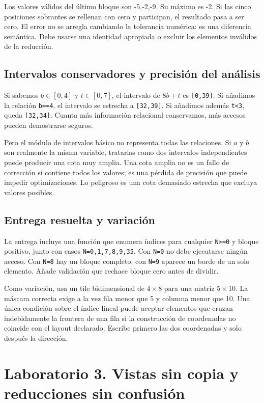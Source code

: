 \documentclass[12pt,a4paper,oneside]{report}
\begin{document}
\begin{ejemplo}
Los valores válidos del último bloque son -5,-2,-9. Su máximo es -2. Si las cinco posiciones sobrantes se rellenan con cero y participan, el resultado pasa a ser cero. El error no se arregla cambiando la tolerancia numérica: es una diferencia semántica. Debe usarse una identidad apropiada o excluir los elementos inválidos de la reducción.

\end{ejemplo}
\section{Intervalos conservadores y precisión del análisis}
Si sabemos $b\in[0,4]$ y $t\in[0,7]$, el intervalo de $8b+t$ es \texttt{[0,39]}. Si añadimos la relación \texttt{b==4}, el intervalo se estrecha a \texttt{[32,39]}. Si añadimos además \texttt{t<3}, queda \texttt{[32,34]}. Cuanta más información relacional conservamos, más accesos pueden demostrarse seguros.

Pero el módulo de intervalos básico no representa todas las relaciones. Si $a$ y $b$ son realmente la misma variable, tratarlas como dos intervalos independientes puede producir una cota muy amplia. Una cota amplia no es un fallo de corrección si contiene todos los valores; es una pérdida de precisión que puede impedir optimizaciones. Lo peligroso es una cota demasiado estrecha que excluya valores posibles.

\section{Entrega resuelta y variación}
La entrega incluye una función que enumera índices para cualquier \texttt{N>=0} y bloque positivo, junto con casos \texttt{N=0,1,7,8,9,35}. Con \texttt{N=0} no debe ejecutarse ningún acceso. Con \texttt{N=8} hay un bloque completo; con \texttt{N=9} aparece un borde de un solo elemento. Añade validación que rechace bloque cero antes de dividir.

Como variación, usa un tile bidimensional de $4\times8$ para una matriz $5\times10$. La máscara correcta exige a la vez fila menor que 5 y columna menor que 10. Una única condición sobre el índice lineal puede aceptar elementos que cruzan indebidamente la frontera de una fila si la construcción de coordenadas no coincide con el layout declarado. Escribe primero las dos coordenadas y solo después la dirección.

\chapter{Laboratorio 3. Vistas sin copia y reducciones sin confusión}
\label{lab:tres}
\end{document}
